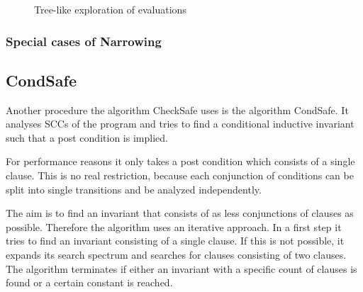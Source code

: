 \begin{figure}
\centering
{}
\caption{Tree-like exploration of evaluations}
\label{fig:backtrack}
\end{figure}

\subsubsection{Special cases of Narrowing}


\subsection{CondSafe}

Another procedure the algorithm CheckSafe uses is the algorithm CondSafe.
It analyses SCCs of the program and tries to find a conditional inductive invariant such that a post condition is implied.

For performance reasons it only takes a post condition which consists of a single clause.
This is no real restriction, because each conjunction of conditions can be split into single transitions and be analyzed independently.

The aim is to find an invariant that consists of as less conjunctions of clauses as possible.
Therefore the algorithm uses an iterative approach.
In a first step it tries to find an invariant consisting of a single clause.
If this is not possible, it expands its search spectrum and searches for clauses consisting of two clauses.
The algorithm terminates if either an invariant with a specific count of clauses is found or a certain constant is reached.

